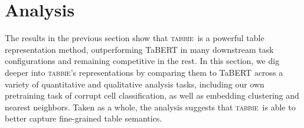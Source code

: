 \documentclass[11pt]{article}
\newcommand{\name}[0]{\textsc{tabbie}}
\begin{document}
\begin{comment}
\textbf{corrupt cell detection}
Corrupt cell detection is a task to predict the error probability of corrupt cells and headers in a given table, which is often used as a post-processing after parsing tables on OCR or table scraping from the web. For this task, we did not perform fine-tuning, but used a pre-trained model directly as the model can predict the error probability of each cell and header(Fig.\ref{fig:finetune} (d)).

\textbf{column type prediction}

Column type prediction is a task to predict attributes of each column given values of cells of a table. In predicting attributes of a column, it is important to understand the context of the table, such as the values in the other columns. In fact, while \cite{DBLP:conf/chi/HuGHBZHK0SD19} is the deep learning based method for predicting column attributes from single column values, \cite{zhang2019sato} improves its accuracy by using table context and co-occurrence label information by LDA and CRF. In this problem setting, header values are not used, so we first replace headers with blank headers and used them as input tables. For finetuning, we add the linear layer and a softmax function to the embedding of \textsc{[cls]} tokens corresponding to the column to be predicted.(Fig.\ref{fig:finetune} (a)) \\

\end{comment}


%
 \section{Analysis}
\label{sec:analysis}

The results in the previous section show that \name\ is a powerful table representation method, outperforming TaBERT in many downstream task configurations and remaining competitive in the rest. In this section, we dig deeper into \name's representations by comparing them to TaBERT across a variety of quantitative and qualitative analysis tasks, including our own pretraining task of corrupt cell classification, as well as embedding clustering and nearest neighbors. Taken as a whole, the analysis suggests that \name\ is able to better capture fine-grained table semantics. 
\end{document}
